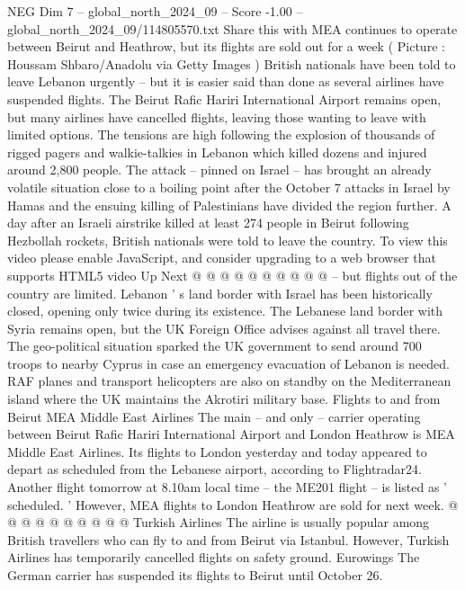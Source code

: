 \begin{textsample}{NEG Dim 7 – global\_north\_2024\_09 – Score -1.00 – global\_north\_2024\_09/114805570.txt}  \label{ex:f7_neg_377}
Share this with MEA continues to operate between Beirut and Heathrow, but its flights are sold out for a week ( Picture : Houssam Shbaro/Anadolu via Getty Images ) British nationals have been told to leave Lebanon urgently -- but it is easier said than done as several airlines have suspended flights.
The Beirut Rafic Hariri International Airport remains open, but many airlines have cancelled flights, leaving those wanting to leave with limited options.
The tensions are high following the explosion of thousands of rigged pagers and walkie-talkies in Lebanon which killed dozens and injured around 2,800 people.
The attack -- pinned on Israel -- has brought an already volatile situation close to a boiling point after the October 7 attacks in Israel by Hamas and the ensuing killing of Palestinians have divided the region further.
A day after an Israeli airstrike killed at least 274 people in Beirut following Hezbollah rockets, British nationals were told to leave the country.
To view this video please enable JavaScript, and consider upgrading to a web browser that supports HTML5 video Up Next @ @ @ @ @ @ @ @ @ @ -- but flights out of the country are limited.
Lebanon ' s land border with Israel has been historically closed, opening only twice during its existence.
The Lebanese land border with Syria remains open, but the UK Foreign Office advises against all travel there.
The geo-political situation sparked the UK government to send around 700 troops to nearby Cyprus in case an emergency evacuation of Lebanon is needed.
RAF planes and transport helicopters are also on standby on the Mediterranean island where the UK maintains the Akrotiri military base.
Flights to and from Beirut MEA Middle East Airlines The main -- and only -- carrier operating between Beirut Rafic Hariri International Airport and London Heathrow is MEA Middle East Airlines.
Its flights to London yesterday and today appeared to depart as scheduled from the Lebanese airport, according to Flightradar24.
Another flight tomorrow at 8.10am local time -- the ME201 flight -- is listed as ' scheduled. ' However, MEA flights to London Heathrow are sold for next week. @ @ @ @ @ @ @ @ @ @ Turkish Airlines The airline is usually popular among British travellers who can fly to and from Beirut via Istanbul.
However, Turkish Airlines has temporarily cancelled flights on safety ground.
Eurowings The German carrier has suspended its flights to Beirut until October 26.

\end{textsample}
